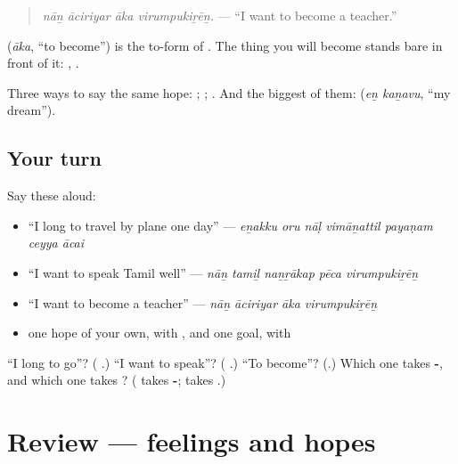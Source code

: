 \begin{quote}
\emph{nāṉ āciriyar āka virumpukiṟēṉ.} — \textquotedblleft{}I want to become a teacher.\textquotedblright{}
\end{quote}

\textbf{} (\emph{āka}, \textquotedblleft{}to become\textquotedblright{}) is the to-form of \textbf{}. The thing you will become stands bare in front of it: \textbf{ }, \textbf{ }.

Three ways to say the same hope: \textbf{   }; \textbf{   }; \textbf{   }. And the biggest of them: \textbf{ } (\emph{eṉ kaṉavu}, \textquotedblleft{}my dream\textquotedblright{}).

\subsection*{Your turn}
Say these aloud:

\begin{itemize}
\raggedright
  \item \textquotedblleft{}I long to travel by plane one day\textquotedblright{} — \emph{eṉakku oru nāḷ vimāṉattil payaṇam ceyya ācai}
  \item \textquotedblleft{}I want to speak Tamil well\textquotedblright{} — \emph{nāṉ tamiḻ naṉṟākap pēca virumpukiṟēṉ}
  \item \textquotedblleft{}I want to become a teacher\textquotedblright{} — \emph{nāṉ āciriyar āka virumpukiṟēṉ}
  \item one hope of your own, with , and one goal, with 
\end{itemize}

\begin{tcolorbox}[breakable,colback=teal!4,colframe=teal!35!black,title={Before you move on}]
\textquotedblleft{}I long to go\textquotedblright{}? (\textbf{  }.) \textquotedblleft{}I want to speak\textquotedblright{}? (\textbf{  }.) \textquotedblleft{}To become\textquotedblright{}? (\textbf{}.) Which one takes \textbf{-}, and which one takes \textbf{}? (\textbf{} takes \textbf{-}; \textbf{} takes \textbf{}.)
\end{tcolorbox}
\section[(review)]{Review — feelings and hopes}

